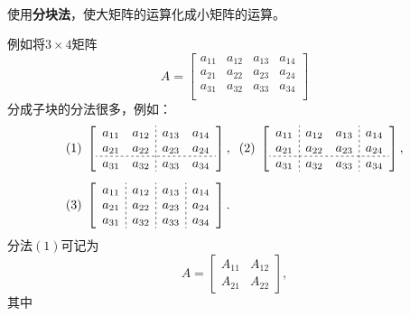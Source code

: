 \paragraph{}
使用\textbf{分块法}，使大矩阵的运算化成小矩阵的运算。

例如将$3\times 4$矩阵
\begin{equation*}
  A = \left[\begin{array}{cccc}
    a_{11} & a_{12} & a_{13} & a_{14} \\
    a_{21} & a_{22} & a_{23} & a_{24} \\
    a_{31} & a_{32} & a_{33} & a_{34} \\
  \end{array}\right]
\end{equation*}
分成子块的分法很多，例如：
\begin{align*}
  & (1)\; \left[\begin{array}{cc;{2pt/2pt}cc}
    a_{11} & a_{12} & a_{13} & a_{14} \\
    a_{21} & a_{22} & a_{23} & a_{24} \\ \hdashline[2pt/2pt]
    a_{31} & a_{32} & a_{33} & a_{34} \\
  \end{array}\right], \;\;
  (2)\; \left[\begin{array}{c;{2pt/2pt}cc;{2pt/2pt}c}
    a_{11} & a_{12} & a_{13} & a_{14} \\
    a_{21} & a_{22} & a_{23} & a_{24} \\ \hdashline[2pt/2pt]
    a_{31} & a_{32} & a_{33} & a_{34} \\
  \end{array}\right], \\[0.5em]
  & (3)\; \left[\begin{array}{c;{2pt/2pt}c;{2pt/2pt}c;{2pt/2pt}c}
    a_{11} & a_{12} & a_{13} & a_{14} \\
    a_{21} & a_{22} & a_{23} & a_{24} \\
    a_{31} & a_{32} & a_{33} & a_{34} \\
  \end{array}\right].
\end{align*}
分法$(1)$可记为
\begin{equation*}
  A = \left[\begin{array}{cc}
    A_{11} & A_{12} \\
    A_{21} & A_{22}
  \end{array}\right],
\end{equation*}
其中

